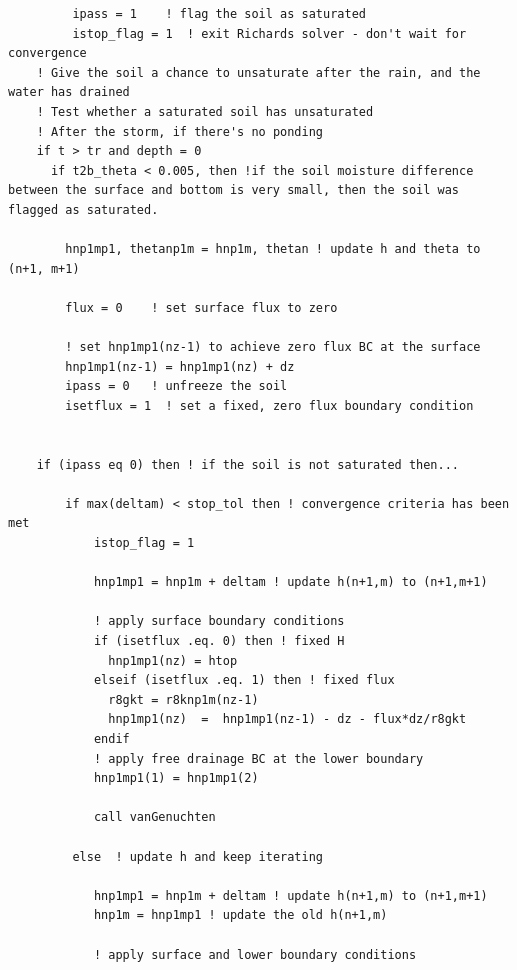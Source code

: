 \documentclass{article}
\newcommand{\code}[1]{\texttt{#1}}
\begin{document}
\begin{lstlisting}
		 ipass = 1    ! flag the soil as saturated
         istop_flag = 1  ! exit Richards solver - don't wait for convergence
	! Give the soil a chance to unsaturate after the rain, and the water has drained
	! Test whether a saturated soil has unsaturated
	! After the storm, if there's no ponding	
	if t > tr and depth = 0  
	  if t2b_theta < 0.005, then !if the soil moisture difference between the surface and bottom is very small, then the soil was flagged as saturated.
	  	
	  	hnp1mp1, thetanp1m = hnp1m, thetan ! update h and theta to (n+1, m+1)		
		
		flux = 0  	! set surface flux to zero
		
		! set hnp1mp1(nz-1) to achieve zero flux BC at the surface
		hnp1mp1(nz-1) = hnp1mp1(nz) + dz 		
		ipass = 0   ! unfreeze the soil
		isetflux = 1  ! set a fixed, zero flux boundary condition
	
	
	if (ipass eq 0) then ! if the soil is not saturated then...

		if max(deltam) < stop_tol then ! convergence criteria has been met
			istop_flag = 1  
			
            hnp1mp1 = hnp1m + deltam ! update h(n+1,m) to (n+1,m+1)            
            
            ! apply surface boundary conditions
            if (isetflux .eq. 0) then ! fixed H
              hnp1mp1(nz) = htop   
            elseif (isetflux .eq. 1) then ! fixed flux
              r8gkt = r8knp1m(nz-1)  
              hnp1mp1(nz)  =  hnp1mp1(nz-1) - dz - flux*dz/r8gkt
            endif
            ! apply free drainage BC at the lower boundary 
            hnp1mp1(1) = hnp1mp1(2)
                        
            call vanGenuchten

         else  ! update h and keep iterating 
         
            hnp1mp1 = hnp1m + deltam ! update h(n+1,m) to (n+1,m+1)             
            hnp1m = hnp1mp1 ! update the old h(n+1,m)
             
			! apply surface and lower boundary conditions

\end{lstlisting}

%
%

\end{document}
